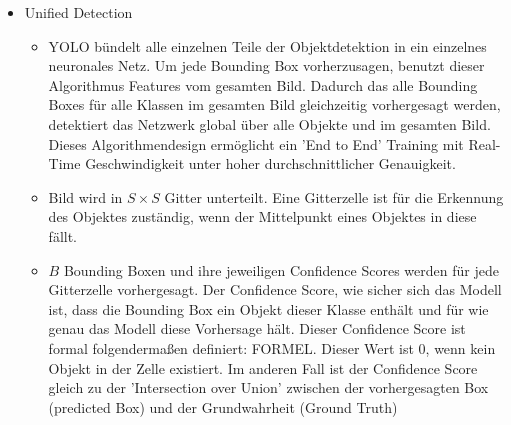 {\begin{itemize}
\begin{itemize}
			\item Zweitens: YOLO analysiert ein Bild global mit Vorhersagen zur Objekterkennung. Durch diese Gesamtbildanalyse kann YOLO während der Training- und Testzeit implizit kontextuelle Informationen über die Klassen und deren Aussehen sammeln. Die Anzahl der Fehler von YOLO beim Verwechselnl von Hintergrund und Objekten im Vordergrund ist weniger als halb so hoch wie bei Fast R-CNN, weil YOLO einen größeren Kontext hat
			\item Drittens: YOLO ist mit  generalisierte Repräsentationen von Objekten trainiert. Die Fehlertoleranz ist bei der Anwendung auf neue Bereiche und unerwartete Eingaben sehr viel größer, da es in hohem Maße verallgemeinerbar ist.
			\item Nachteil von YOLO ist die Genauigkeit. Es hat Schwierigkeiten einige Objekte, insbesondere kleinere, genau zu lokalisieren, obwohl es sonst sehr schnell ist.
			\item Die Trainingsdaten und der Quellcode von YOLO sind Open Source. Es sind außerdem mehrere vortrainierte Modelle zum Download verfügbar.
		\end{itemize}
		\item Unified Detection
		\begin{itemize}
			\item YOLO bündelt alle einzelnen Teile der Objektdetektion in ein einzelnes neuronales Netz. Um jede Bounding Box vorherzusagen, benutzt dieser Algorithmus Features vom gesamten Bild. Dadurch das alle Bounding Boxes für alle Klassen im gesamten Bild gleichzeitig vorhergesagt werden, detektiert das Netzwerk global über alle Objekte und im gesamten Bild. Dieses Algorithmendesign ermöglicht ein 'End to End' Training mit Real-Time Geschwindigkeit unter hoher durchschnittlicher Genauigkeit.
			\item Bild wird in $S \times S$ Gitter unterteilt. Eine Gitterzelle ist für die Erkennung des Objektes zuständig, wenn der Mittelpunkt eines Objektes in diese fällt.
			\item $B$ Bounding Boxen und  ihre jeweiligen Confidence Scores werden für jede Gitterzelle vorhergesagt. Der Confidence Score, wie sicher sich das Modell ist, dass die Bounding Box ein Objekt dieser Klasse enthält und für wie genau das Modell diese Vorhersage hält. Dieser Confidence Score ist formal folgendermaßen definiert: FORMEL. Dieser Wert ist 0, wenn kein Objekt in der Zelle existiert. Im anderen Fall ist der Confidence Score gleich zu der 'Intersection over Union' zwischen der vorhergesagten Box (predicted Box) und der Grundwahrheit (Ground Truth)

\end{itemize}
\end{itemize}}
